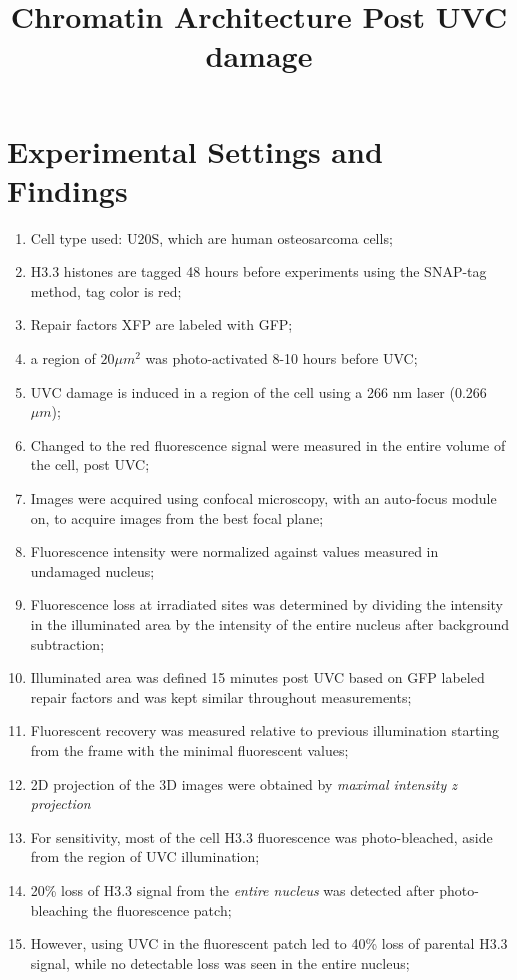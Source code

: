 \documentclass[12pt]{report}
\begin{document}
	
	\title{Chromatin Architecture Post UVC damage}
	\maketitle
	\section{Experimental Settings and Findings}
	\begin{enumerate}
		\item Cell type used: U20S, which are human osteosarcoma cells;
		\item H3.3 histones are tagged 48 hours before experiments using the SNAP-tag method, tag color is red;
		\item Repair factors XFP are labeled with GFP;
		\item a region of $20 \mu m^2$ was photo-activated 8-10 hours before UVC;
		\item UVC damage is induced in a region of the cell using a 266 nm laser (0.266 $\mu m$);
		\item Changed to the red fluorescence signal were measured in the entire volume of the cell, post UVC;
		\item Images were acquired using confocal microscopy, with an auto-focus module on, to acquire images from the best focal plane;
		\item Fluorescence intensity were normalized against values measured in undamaged nucleus;
		\item Fluorescence loss at irradiated sites was determined by dividing the intensity in the illuminated area by the intensity of the entire nucleus after background subtraction;
		\item Illuminated area was defined 15 minutes post UVC based on GFP labeled repair factors and was kept similar throughout measurements;
		\item Fluorescent recovery was measured relative to previous illumination starting from the frame with the minimal fluorescent values;
		\item 2D projection of the 3D images were obtained by \textit{maximal intensity z projection}
		\item For sensitivity, most of the cell H3.3 fluorescence was photo-bleached, aside from the region of UVC illumination;
		\item 20\% loss of H3.3 signal from the \textit{entire nucleus} was detected after photo-bleaching the fluorescence patch;
		\item However, using UVC in the fluorescent patch led to 40\% loss of parental H3.3 signal, while no detectable loss was seen in the entire nucleus;		

\end{enumerate}
\end{document}
